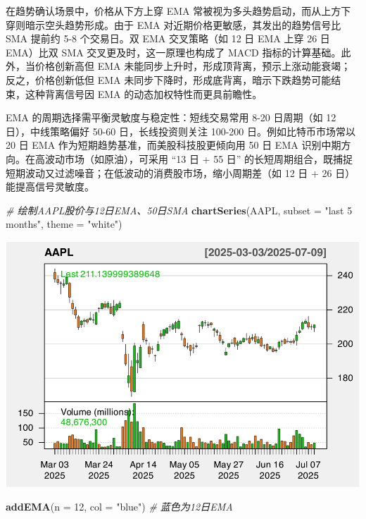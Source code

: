\documentclass[]{ctexbook}
\newenvironment{Shaded}{\begin{snugshade}}{\end{snugshade}}
\newcommand{\AttributeTok}[1]{\textcolor[rgb]{0.13,0.29,0.53}{#1}}
\newcommand{\CommentTok}[1]{\textcolor[rgb]{0.56,0.35,0.01}{\textit{#1}}}
\newcommand{\DecValTok}[1]{\textcolor[rgb]{0.00,0.00,0.81}{#1}}
\newcommand{\FunctionTok}[1]{\textcolor[rgb]{0.13,0.29,0.53}{\textbf{#1}}}
\newcommand{\NormalTok}[1]{#1}
\newcommand{\StringTok}[1]{\textcolor[rgb]{0.31,0.60,0.02}{#1}}
\begin{document}
在趋势确认场景中，价格从下方上穿 EMA 常被视为多头趋势启动，而从上方下穿则暗示空头趋势形成。由于 EMA 对近期价格更敏感，其发出的趋势信号比 SMA 提前约 5-8 个交易日。双 EMA 交叉策略（如 12 日 EMA 上穿 26 日 EMA）比双 SMA 交叉更及时，这一原理也构成了 MACD 指标的计算基础。此外，当价格创新高但 EMA 未能同步上升时，形成顶背离，预示上涨动能衰竭；反之，价格创新低但 EMA 未同步下降时，形成底背离，暗示下跌趋势可能结束，这种背离信号因 EMA 的动态加权特性而更具前瞻性。

EMA 的周期选择需平衡灵敏度与稳定性：短线交易常用 8-20 日周期（如 12 日），中线策略偏好 50-60 日，长线投资则关注 100-200 日。例如比特币市场常以 20 日 EMA 作为短期趋势基准，而美股科技股更倾向用 50 日 EMA 识别中期方向。在高波动市场（如原油），可采用 ``13 日 + 55 日'' 的长短周期组合，既捕捉短期波动又过滤噪音；在低波动的消费股市场，缩小周期差（如 12 日 + 26 日）能提高信号灵敏度。

\begin{Shaded}
\begin{Highlighting}[]
\CommentTok{\# 绘制AAPL股价与12日EMA、50日SMA}
\FunctionTok{chartSeries}\NormalTok{(AAPL, }\AttributeTok{subset =} \StringTok{"last 5 months"}\NormalTok{, }\AttributeTok{theme =} \StringTok{"white"}\NormalTok{)}
\end{Highlighting}
\end{Shaded}

\includegraphics[width=0.9\linewidth]{quantmod_files/figure-latex/ema-1}

\begin{Shaded}
\begin{Highlighting}[]
\FunctionTok{addEMA}\NormalTok{(}\AttributeTok{n =} \DecValTok{12}\NormalTok{, }\AttributeTok{col =} \StringTok{"blue"}\NormalTok{)    }\CommentTok{\# 蓝色为12日EMA}
\end{Highlighting}
\end{Shaded}
\end{document}
